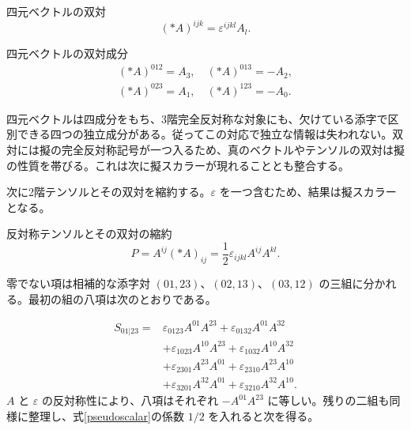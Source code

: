 \documentclass[a4paper,12pt]{article}
\begin{document}
\begin{definitionBox}{四元ベクトルの双対}
\begin{equation}\label{dual-three}
(*A)^{ijk}=\varepsilon^{ijkl}A_l.
\end{equation}
\end{definitionBox}

\begin{resultBox}{四元ベクトルの双対成分}
\begin{equation}\label{dual-vector}
\begin{gathered}(*A)^{012}=A_3,\quad (*A)^{013}=-A_2,\\(*A)^{023}=A_1,\quad (*A)^{123}=-A_0.\end{gathered}
\end{equation}
\end{resultBox}

四元ベクトルは四成分をもち、3階完全反対称な対象にも、欠けている添字で区別できる四つの独立成分がある。従ってこの対応で独立な情報は失われない。双対には擬の完全反対称記号が一つ入るため、真のベクトルやテンソルの双対は擬の性質を帯びる。これは次に擬スカラーが現れることとも整合する。

次に2階テンソルとその双対を縮約する。$\varepsilon$ を一つ含むため、結果は擬スカラーとなる。

\begin{definitionBox}{反対称テンソルとその双対の縮約}
\begin{equation}\label{pseudoscalar}
P=A^{ij}(*A)_{ij}=\frac12\varepsilon_{ijkl}A^{ij}A^{kl}.
\end{equation}
\end{definitionBox}
零でない項は相補的な添字対 $(01,23)$、$(02,13)$、$(03,12)$ の三組に分かれる。最初の組の八項は次のとおりである。

\begin{equation}\label{eight-terms}
\begin{aligned}S_{01|23}={}&\varepsilon_{0123}A^{01}A^{23}+\varepsilon_{0132}A^{01}A^{32}\\&+\varepsilon_{1023}A^{10}A^{23}+\varepsilon_{1032}A^{10}A^{32}\\&+\varepsilon_{2301}A^{23}A^{01}+\varepsilon_{2310}A^{23}A^{10}\\&+\varepsilon_{3201}A^{32}A^{01}+\varepsilon_{3210}A^{32}A^{10}.\end{aligned}
\end{equation}
$A$ と $\varepsilon$ の反対称性により、八項はそれぞれ $-A^{01}A^{23}$ に等しい。残りの二組も同様に整理し、式\eqref{pseudoscalar}の係数 $1/2$ を入れると次を得る。
\end{document}
